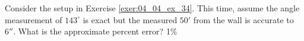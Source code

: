 {Consider the setup in Exercise \ref{exer:04_04_ex_34}. This time, assume the angle measurement of $143^\circ$ is exact but the measured $50'$ from the wall is accurate to $6''$. What is the approximate percent error?
}
{1\%
}

